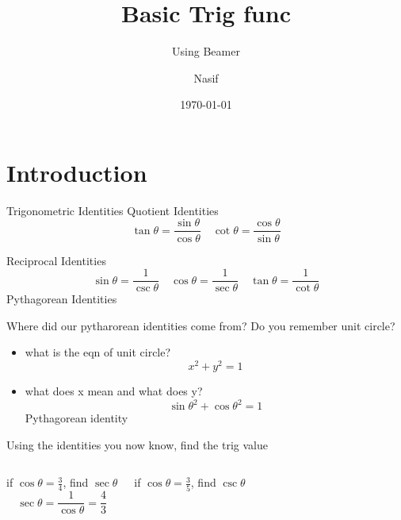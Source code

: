 \documentclass{beamer}
\title{Basic Trig func}
\subtitle{Using Beamer}
\author{Nasif}
\institute{BUET}
\date{\today}
\begin{document}
\section{Introduction}

\begin{frame}
    \titlepage
\end{frame}

\begin{frame}{Trigonometric Identities}
    Quotient Identities
    \[ \tan{\theta} = \frac{\sin{\theta}}{\cos{\theta}} \quad \cot{\theta} = \frac{\cos{\theta}}{\sin{\theta}} \]

    Reciprocal Identities
    \[
    \sin{\theta} = \frac{1}{\csc{\theta}}
    \quad
    \cos{\theta} = \frac{1}{\sec{\theta}}
    \quad
    \tan{\theta} = \frac{1}{\cot{\theta}}
    \]
    Pythagorean Identities
\end{frame}

\begin{frame}{Where did our pytharorean identities come from?}
\Large{Do you remember unit circle?}
    \begin{itemize}
        \item what is the eqn of unit circle?
        \pause
        \[
    x^2+y^2=1
        \]
        \item what does x mean and what does y?
        \pause
        \[
    \sin{\theta}^2+\cos{\theta}^2=1
        \]
        \pause
        Pythagorean identity
    \end{itemize}
\end{frame}

\begin{frame}{Using the identities you now know, find the trig value}
    \begin{enumerate}
    \begin{columns}
        
            \item if $\cos{\theta}=\frac{3}{4}$, find $\sec{\theta}$
            \pause
        \[
    \sec{\theta}=\frac{1}{\cos{\theta}}=\frac{4}{3}
            \]
    \pause
        \item if $\cos{\theta}=\frac{3}{5}$, find $\csc{\theta}$
    \end{columns}
    \end{enumerate}
\end{frame}
\end{document}
